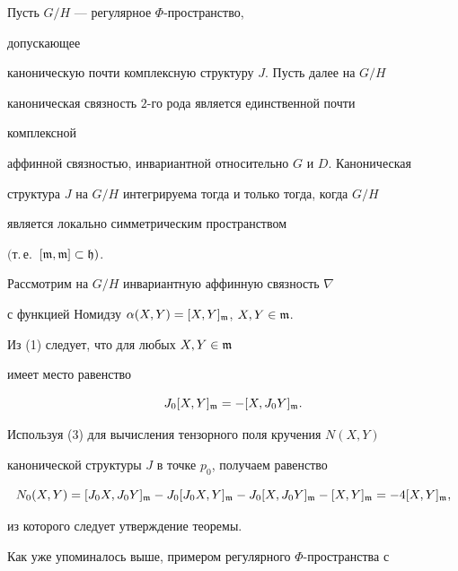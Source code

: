  


\begin{thm} Пусть $G/H$ --- регулярное $\Phi$-пространство, 


допускающее 


каноническую почти комплексную структуру $J$. Пусть далее на $G/H$ 


каноническая связность $2$-го рода является единственной почти 


комплексной 


аффинной связностью, инвариантной относительно $G$ и $D$. Каноническая 


структура $J$ на $G/H$ интегрируема тогда и только тогда, когда $G/H$ 


является локально симметрическим пространством 


$($т.\,е.~$[\frak m,\frak m]\subset\frak h)$. 


\end{thm} 


 


\begin{pf} Рассмотрим на $G/H$ инвариантную аффинную связность $\nabla$ 


с функцией Номидзу $\alpha(X,Y)=[X,Y]_{\frak m}$, $X,Y\in\frak m$. 


Из (1) следует, что для любых $X,Y\in\frak m$ 


имеет место равенство 


\begin{equation} 


J_0[X,Y]_{\frak m}=-[X,J_0Y]_{\frak m}. 


\end{equation} 


Используя (3) для вычисления тензорного поля кручения $N(X,Y)$ 


канонической структуры $J$ в точке $p_0$, получаем равенство 


$$ 


N_0(X,Y)=[J_0X,J_0Y]_{\frak m}-J_0[J_0X,Y]_{\frak m}- 


J_0[X,J_0Y]_{\frak m}-[X,Y]_{\frak m}=-4[X,Y]_{\frak m}, 


$$ 


из которого следует утверждение теоремы. 


\end{pf} 


 


Как уже упоминалось выше, примером регулярного $\Phi$-пространства с 


